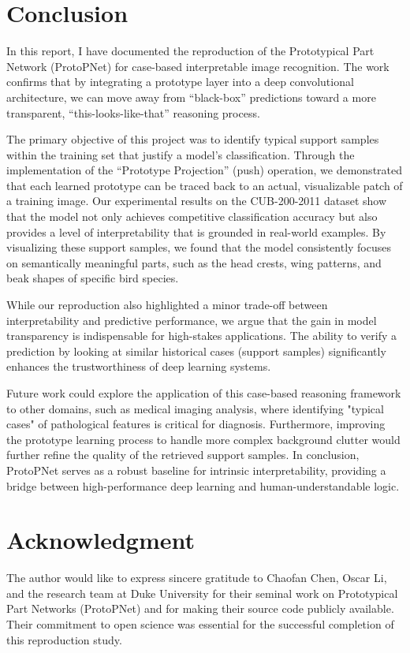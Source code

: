 \documentclass[conference]{IEEEtran}
\begin{document}
\section{Conclusion}
\label{sec:conclusion}
In this report, I have documented the reproduction of the Prototypical Part Network (ProtoPNet) for case-based interpretable image recognition. The work confirms that by integrating a prototype layer into a deep convolutional architecture, we can move away from ``black-box'' predictions toward a more transparent, ``this-looks-like-that'' reasoning process.

The primary objective of this project was to identify typical support samples within the training set that justify a model's classification. Through the implementation of the ``Prototype Projection'' (push) operation, we demonstrated that each learned prototype can be traced back to an actual, visualizable patch of a training image. Our experimental results on the CUB-200-2011 dataset show that the model not only achieves competitive classification accuracy but also provides a level of interpretability that is grounded in real-world examples. By visualizing these support samples, we found that the model consistently focuses on semantically meaningful parts, such as the head crests, wing patterns, and beak shapes of specific bird species.

While our reproduction also highlighted a minor trade-off between interpretability and predictive performance, we argue that the gain in model transparency is indispensable for high-stakes applications. The ability to verify a prediction by looking at similar historical cases (support samples) significantly enhances the trustworthiness of deep learning systems.

Future work could explore the application of this case-based reasoning framework to other domains, such as medical imaging analysis, where identifying "typical cases" of pathological features is critical for diagnosis. Furthermore, improving the prototype learning process to handle more complex background clutter would further refine the quality of the retrieved support samples. In conclusion, ProtoPNet serves as a robust baseline for intrinsic interpretability, providing a bridge between high-performance deep learning and human-understandable logic.

\section*{Acknowledgment}
The author would like to express sincere gratitude to Chaofan Chen, Oscar Li, and the research team at Duke University for their seminal work on Prototypical Part Networks (ProtoPNet) and for making their source code publicly available. Their commitment to open science was essential for the successful completion of this reproduction study. 
  
\end{document}
